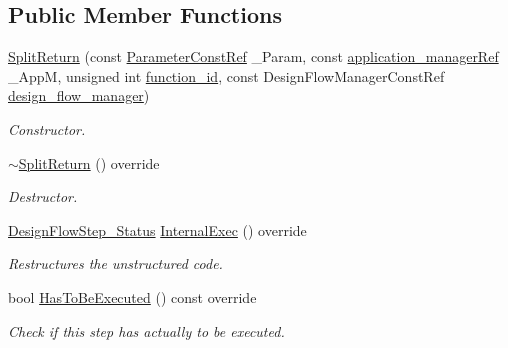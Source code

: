 \subsection*{Public Member Functions}
\begin{DoxyCompactItemize}
\item 
\hyperlink{classSplitReturn_a74a7cd61e81ae6f4da3660ad5bfd8796}{Split\+Return} (const \hyperlink{Parameter_8hpp_a37841774a6fcb479b597fdf8955eb4ea}{Parameter\+Const\+Ref} \+\_\+\+Param, const \hyperlink{application__manager_8hpp_a04ccad4e5ee401e8934306672082c180}{application\+\_\+manager\+Ref} \+\_\+\+AppM, unsigned int \hyperlink{classFunctionFrontendFlowStep_a58ef2383ad1a212a8d3f396625a4b616}{function\+\_\+id}, const Design\+Flow\+Manager\+Const\+Ref \hyperlink{classDesignFlowStep_ab770677ddf087613add30024e16a5554}{design\+\_\+flow\+\_\+manager})
\begin{DoxyCompactList}\small\item\em Constructor. \end{DoxyCompactList}\item 
\hyperlink{classSplitReturn_a1785d270d9d6e274c10d0918d032cff6}{$\sim$\+Split\+Return} () override
\begin{DoxyCompactList}\small\item\em Destructor. \end{DoxyCompactList}\item 
\hyperlink{design__flow__step_8hpp_afb1f0d73069c26076b8d31dbc8ebecdf}{Design\+Flow\+Step\+\_\+\+Status} \hyperlink{classSplitReturn_a13e75f94bea3e3dfc28e026af60e49db}{Internal\+Exec} () override
\begin{DoxyCompactList}\small\item\em Restructures the unstructured code. \end{DoxyCompactList}\item 
bool \hyperlink{classSplitReturn_a807a2c344e7d217d4164065e1e4e10da}{Has\+To\+Be\+Executed} () const override
\begin{DoxyCompactList}\small\item\em Check if this step has actually to be executed. \end{DoxyCompactList}\end{DoxyCompactItemize}

